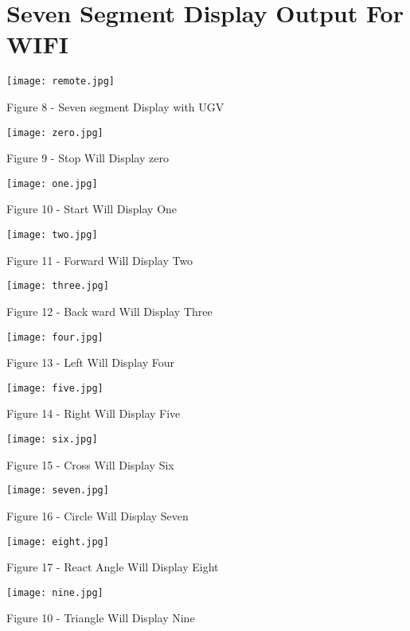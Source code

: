 \documentclass[journal,15pt,twocolumn,tikz, border=5mm]{IEEEtran}
\begin{document}
\section{Seven Segment Display Output For WIFI}
\texttt{[image: remote.jpg]}
\centerline{Figure 8 -   Seven segment Display with UGV }
\texttt{[image: zero.jpg]}
\centerline{Figure 9 -   Stop Will Display zero }
\texttt{[image: one.jpg]}
\centerline{Figure 10 -  Start Will Display One }
\texttt{[image: two.jpg]}
\centerline{Figure 11 -  Forward Will Display Two }
\texttt{[image: three.jpg]}
\centerline{Figure 12 -  Back ward Will Display Three }
\texttt{[image: four.jpg]}
\centerline{Figure 13 -  Left Will Display Four }
\texttt{[image: five.jpg]}
\centerline{Figure 14 -  Right Will Display Five }
\texttt{[image: six.jpg]}
\centerline{Figure 15 -  Cross Will Display Six }
\texttt{[image: seven.jpg]}
\centerline{Figure 16 -  Circle Will Display Seven }
\texttt{[image: eight.jpg]}
\centerline{Figure 17 -  React Angle Will Display Eight }
\texttt{[image: nine.jpg]}
\centerline{Figure 10 -  Triangle Will Display Nine }
\end{document}
